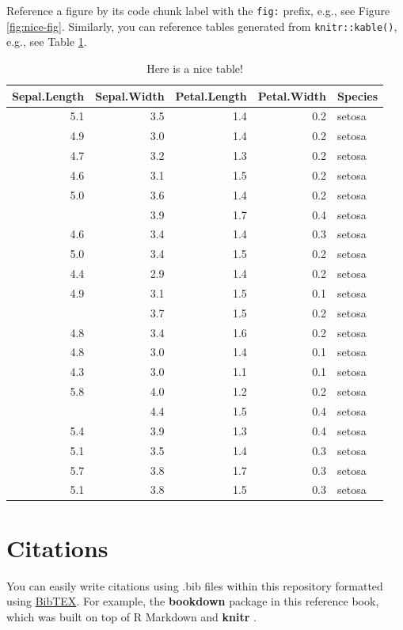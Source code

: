 \documentclass[
]{book}
\begin{document}
Reference a figure by its code chunk label with the \texttt{fig:} prefix, e.g., see Figure \ref{fig:nice-fig}. Similarly, you can reference tables generated from \texttt{knitr::kable()}, e.g., see Table \ref{tab:nice-tab}.

\begin{table}

\caption{\label{tab:nice-tab}Here is a nice table!}
\centering
\begin{tabular}[t]{rrrrl}
\toprule
Sepal.Length & Sepal.Width & Petal.Length & Petal.Width & Species\\
\midrule
5.1 & 3.5 & 1.4 & 0.2 & setosa\\
4.9 & 3.0 & 1.4 & 0.2 & setosa\\
4.7 & 3.2 & 1.3 & 0.2 & setosa\\
4.6 & 3.1 & 1.5 & 0.2 & setosa\\
5.0 & 3.6 & 1.4 & 0.2 & setosa\\
\addlinespace
5.4 & 3.9 & 1.7 & 0.4 & setosa\\
4.6 & 3.4 & 1.4 & 0.3 & setosa\\
5.0 & 3.4 & 1.5 & 0.2 & setosa\\
4.4 & 2.9 & 1.4 & 0.2 & setosa\\
4.9 & 3.1 & 1.5 & 0.1 & setosa\\
\addlinespace
5.4 & 3.7 & 1.5 & 0.2 & setosa\\
4.8 & 3.4 & 1.6 & 0.2 & setosa\\
4.8 & 3.0 & 1.4 & 0.1 & setosa\\
4.3 & 3.0 & 1.1 & 0.1 & setosa\\
5.8 & 4.0 & 1.2 & 0.2 & setosa\\
\addlinespace
5.7 & 4.4 & 1.5 & 0.4 & setosa\\
5.4 & 3.9 & 1.3 & 0.4 & setosa\\
5.1 & 3.5 & 1.4 & 0.3 & setosa\\
5.7 & 3.8 & 1.7 & 0.3 & setosa\\
5.1 & 3.8 & 1.5 & 0.3 & setosa\\
\bottomrule
\end{tabular}
\end{table}

\hypertarget{citations}{%
\section{Citations}\label{citations}}

You can easily write citations using .bib files within this repository formatted using \href{http://www.bibtex.org/}{BibTEX}. For example, the \textbf{bookdown} package \citep{R-bookdown} in this reference book, which was built on top of R Markdown and \textbf{knitr} \citep{xie2015}.
\end{document}
